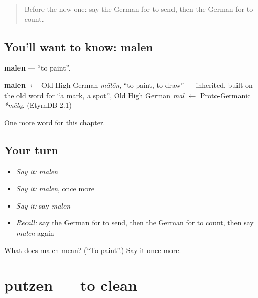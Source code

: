 \label{lesson:GE-C68-malen}



\begin{quote}
Before the new one: say the German for to send, then the German for to count.
\end{quote}

\subsection*{You'll want to know: malen}
\textbf{malen} — \textquotedblleft{}to paint\textquotedblright{}.

\begin{cousinweb}
\textbf{malen} $\leftarrow$ Old High German \emph{mālōn}, \textquotedblleft{}to paint, to draw\textquotedblright{} — inherited, built on the old word for \textquotedblleft{}a mark, a spot\textquotedblright{}, Old High German \emph{māl} $\leftarrow$ Proto-Germanic \emph{*mēlą}. (EtymDB 2.1)
\end{cousinweb}

\begin{grammarlens}[title={What you've built}]
One more word for this chapter.
\end{grammarlens}

\subsection*{Your turn}
\begin{itemize}
\raggedright
  \item \emph{Say it:} \emph{malen}
  \item \emph{Say it:} \emph{malen}, once more
  \item \emph{Say it:} say \emph{malen}
  \item \emph{Recall:} say the German for to send, then the German for to count, then say \emph{malen} again
\end{itemize}

\begin{tcolorbox}[breakable,colback=teal!4,colframe=teal!35!black,title={Before you move on}]
What does malen mean? (\textquotedblleft{}To paint\textquotedblright{}.) Say it once more.
\end{tcolorbox}
\section[putzen]{putzen — to clean}

\label{lesson:GE-C68-putzen}



